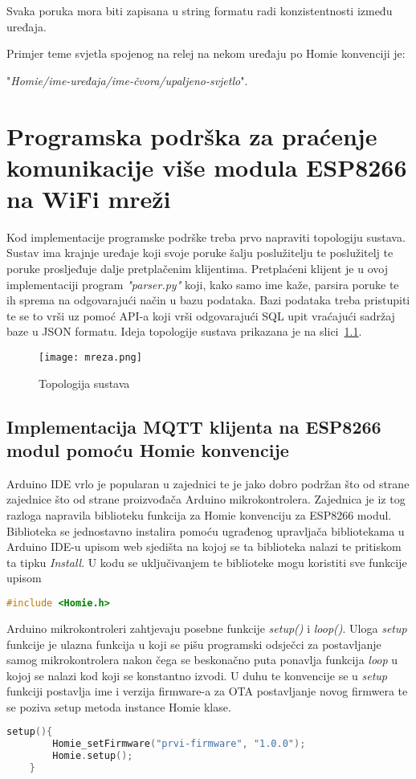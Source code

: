 \documentclass[times, utf8, zavrsni]{fer}
\begin{document}
{Svaka poruka mora biti zapisana u string formatu radi konzistentnosti između uređaja.

Primjer teme svjetla spojenog na relej na nekom uređaju po Homie konvenciji je:

"\textit{Homie/ime-uređaja/ime-čvora/upaljeno-svjetlo}".

\chapter{Programska podrška za praćenje komunikacije više modula ESP8266 na WiFi mreži}
Kod implementacije programske podrške treba prvo napraviti topologiju sustava.
Sustav ima krajnje uređaje koji svoje poruke šalju poslužitelju te poslužitelj te poruke prosljeđuje dalje pretplačenim klijentima.
Pretplaćeni klijent je u ovoj implementaciji program \textit{"parser.py"} koji, kako samo ime kaže, parsira poruke te ih sprema na odgovarajući način u bazu podataka.
Bazi podataka treba pristupiti te se to vrši uz pomoć API-a koji vrši odgovarajući SQL upit vraćajući sadržaj baze u JSON formatu.
Ideja topologije sustava prikazana je na slici~\ref{fig:mreza}.

\begin{figure}[h]
    \centering
    \texttt{[image: mreza.png]}
    \caption{Topologija sustava}\label{fig:mreza}
\end{figure}

\section{Implementacija MQTT klijenta na ESP8266 modul pomoću Homie konvencije}
Arduino IDE vrlo je popularan u zajednici te je jako dobro podržan što od strane zajednice što od strane proizvođača Arduino mikrokontrolera.
Zajednica je iz tog razloga napravila biblioteku funkcija za Homie konvenciju za ESP8266 modul.
Biblioteka se jednostavno instalira pomoću ugrađenog upravljača bibliotekama u Arduino IDE-u upisom web sjedišta na kojoj se ta biblioteka nalazi te pritiskom ta tipku \textit{Install}.
U kodu se uključivanjem te biblioteke mogu koristiti sve funkcije upisom
\begin{lstlisting}[language=c++, caption=Uključivanje Homie biblioteke]
    #include <Homie.h>
\end{lstlisting}

Arduino mikrokontroleri zahtjevaju posebne funkcije \textit{setup()} i \textit{loop()}.
Uloga \textit{setup} funkcije je ulazna funkcija u koji se pišu programski odsječci za postavljanje samog mikrokontrolera nakon čega se beskonačno puta ponavlja funkcija \textit{loop} u kojoj se nalazi kod koji se konstantno izvodi.
U duhu te konvencije se u \textit{setup} funkciji postavlja ime i verzija firmware-a za OTA postavljanje novog firmwera te se poziva setup metoda instance Homie klase.
\begin{lstlisting}[language=c++]
    setup(){
        Homie_setFirmware("prvi-firmware", "1.0.0");
        Homie.setup();
    }
\end{lstlisting}

}
\end{document}
